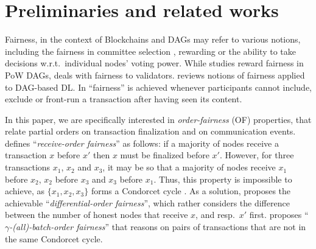 

\section{Preliminaries and related works\label{sec:related}}


Fairness, in the context of Blockchains \cite{on_fairness_in_commitee_based_blockchains,on_fairness_in_voting_consensus_protocols} and DAGs \cite{fairness_notions_in_dag_based_dlts} may refer to various notions, including the fairness in committee selection \cite{on_fairness_in_commitee_based_blockchains}, rewarding \cite{do_the_rich_get_richer_fairness_analysis_for_blockchain_incentives} or the ability to take decisions \cite{on_fairness_in_voting_consensus_protocols,fairledger_a_fair_blockchain_protocol_for_financial_institutions} w.r.t.~individual nodes' voting power. 
While \cite{fairness_and_efficiency_in_dag_based_cryptocurrencies} studies reward fairness in PoW DAGs, \cite{on_fairness_in_voting_consensus_protocols} deals with fairness to validators.
\cite{fairness_notions_in_dag_based_dlts} reviews notions of fairness applied to DAG-based DL.
In \cite{sok_preventing_transaction_reordering_manipulations_in_decentralized_finance} ``fairness'' is achieved whenever participants cannot include, exclude or front-run \cite{flash_boys_frontrunning_in_decentralized_exchanges_miner_extractable_value_and_consensus_instability} a transaction after having seen its content.


In this paper, we are specifically interested in {\em order-fairness} \cite{order_fairness_for_byzantine_consensus,quick_order_fairness,byzantine_ordered_consensus_without_byzantine_oligarchy,themis_fast_strong_order_fairness_in_byzantine_consensus} (OF) properties, that relate partial orders on transaction finalization and on communication events.
\cite{order_fairness_for_byzantine_consensus} defines ``\textit{receive-order fairness}'' as follows: if a majority of nodes receive a transaction $x$ before $x'$ then $x$ must be finalized before $x'$.
However, for three transactions $x_1$, $x_2$ and $x_3$, it may be so that a majority of nodes receive $x_1$ before $x_2$, $x_2$ before $x_3$ and $x_3$ before $x_1$. Thus, this property is impossible to achieve, as $\{x_1,x_2,x_3\}$ forms a Condorcet cycle \cite{condorcet_attack_against_fair_transaction_ordering}.
As a solution, \cite{quick_order_fairness} proposes the achievable ``\textit{differential-order fairness}'', which rather considers the difference between the number of honest nodes that receive $x$, and resp.~$x'$ first.
\cite{themis_fast_strong_order_fairness_in_byzantine_consensus} proposes ``\textit{$\gamma$-(all)-batch-order fairness}'' that reasons on pairs of transactions that are not in the same Condorcet cycle.



